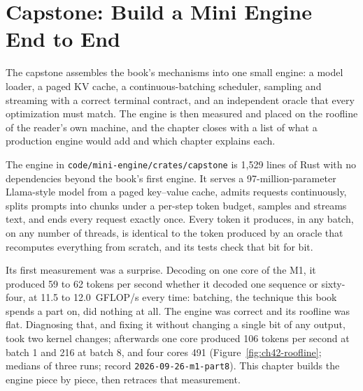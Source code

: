 \chapter{Capstone: Build a Mini Engine End to End}\label{ch:capstone}

\begin{ChapterIntent}
The capstone assembles the book's mechanisms into one small engine: a
model loader, a paged KV cache, a continuous-batching scheduler, sampling and
streaming with a correct terminal contract, and an independent oracle that
every optimization must match. The engine is then measured and placed on the
roofline of the reader's own machine, and the chapter closes with a list of
what a production engine would add and which chapter explains each.
\end{ChapterIntent}


The engine in \texttt{code/mini-engine/crates/capstone} is 1,529 lines of Rust
with no dependencies beyond the book's first engine. It serves a
97-million-parameter Llama-style model from a paged key--value cache, admits
requests continuously, splits prompts into chunks under a per-step token
budget, samples and streams text, and ends every request exactly once. Every
token it produces, in any batch, on any number of threads, is identical to the
token produced by an oracle that recomputes everything from scratch, and its
tests check that bit for bit.

Its first measurement was a surprise. Decoding on one core of the M1, it
produced 59 to 62 tokens per second whether it decoded one sequence or
sixty-four, at 11.5 to 12.0~GFLOP/s every time: batching, the technique this
book spends a part on, did nothing at all. The engine was correct and its
roofline was flat. Diagnosing that, and fixing it without changing a single
bit of any output, took two kernel changes; afterwards one core produced 106
tokens per second at batch 1 and 216 at batch 8, and four cores 491
(Figure~\ref{fig:ch42-roofline}; medians of three runs; record
\texttt{2026-09-26-m1-part8}). This chapter builds the engine piece by piece,
then retraces that measurement.


